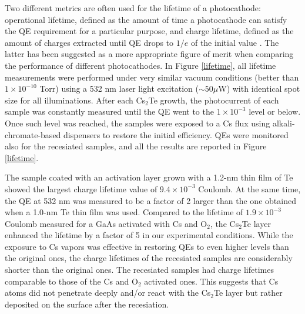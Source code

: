 Two different metrics are often used for the lifetime of a photocathode: operational lifetime, defined as the amount of time a photocathode can satisfy the QE requirement for a particular purpose, and charge lifetime, defined as the amount of charges extracted until QE drops to $1/e$ of the initial value \cite{grames2011_ChargeFluenceLifetime}. The latter has been suggested as a more appropriate figure of merit when comparing the performance of different photocathodes. %
In Figure \ref{lifetime}, all lifetime measurements were performed under very similar vacuum conditions (better than $1\times10^{-10}$ Torr) using a 532 nm laser light excitation ($\sim{50} \mu$W) with identical spot size for all illuminations. After each Cs$_2$Te growth, the photocurrent of each sample was constantly measured until the QE went to the $1\times10^{-3}$ level or below. Once such level was reached, the samples were exposed to a Cs flux using alkali-chromate-based dispensers to restore the initial efficiency. QEs were monitored also for the recesiated samples, and all the results are reported in Figure \ref{lifetime}.

The sample coated with an activation layer grown with a 1.2-nm thin film of Te showed the largest charge lifetime value of $9.4\times10^{-3}$  Coulomb. At the same time, the QE at 532 nm was measured to be a factor of 2 larger than the one obtained when a 1.0-nm Te thin film was used. 
Compared to the lifetime of $1.9\times10^{-3}$ Coulomb measured for a GaAs activated with Cs and O$_2$, the Cs$_2$Te layer enhanced the lifetime by a factor of 5 in our experimental conditions.
While the exposure to Cs vapors was effective in restoring QEs to even higher levels than the original ones, the charge lifetimes of the recesiated samples are considerably shorter than the original ones. The recesiated samples had charge lifetimes comparable to those of the Cs and O$_2$ activated ones. This suggests that Cs atoms did not penetrate deeply and/or react with the Cs$_2$Te layer but rather deposited on the surface after the recesiation.

